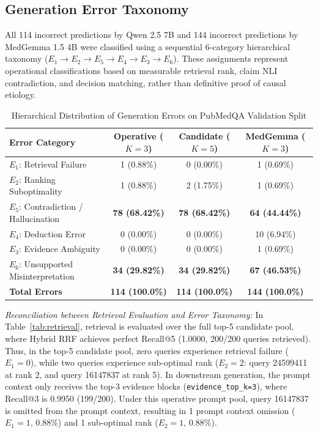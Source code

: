 \documentclass[journal,10pt]{IEEEtran}
\begin{document}
\subsection{Generation Error Taxonomy}
All 114 incorrect predictions by Qwen 2.5 7B and 144 incorrect predictions by MedGemma 1.5 4B were classified using a sequential 6-category hierarchical taxonomy ($E_1 \to E_2 \to E_5 \to E_4 \to E_3 \to E_6$). These assignments represent operational classifications based on measurable retrieval rank, claim NLI contradiction, and decision matching, rather than definitive proof of causal etiology.

\begin{table}[htbp]
\caption{Hierarchical Distribution of Generation Errors on PubMedQA Validation Split}
\label{tab:taxonomy}
\centering
\begin{tabular}{lccc}
\toprule
\textbf{Error Category} & \textbf{Operative ($K=3$)} & \textbf{Candidate ($K=5$)} & \textbf{MedGemma ($K=3$)} \\
\midrule
$E_1$: Retrieval Failure & 1 (0.88\%) & 0 (0.00\%) & 1 (0.69\%) \\
$E_2$: Ranking Suboptimality & 1 (0.88\%) & 2 (1.75\%) & 1 (0.69\%) \\
$E_5$: Contradiction / Hallucination & \textbf{78 (68.42\%)} & \textbf{78 (68.42\%)} & \textbf{64 (44.44\%)} \\
$E_4$: Deduction Error & 0 (0.00\%) & 0 (0.00\%) & 10 (6.94\%) \\
$E_3$: Evidence Ambiguity & 0 (0.00\%) & 0 (0.00\%) & 1 (0.69\%) \\
$E_6$: Unsupported Misinterpretation & \textbf{34 (29.82\%)} & \textbf{34 (29.82\%)} & \textbf{67 (46.53\%)} \\
\midrule
\textbf{Total Errors} & \textbf{114 (100.0\%)} & \textbf{114 (100.0\%)} & \textbf{144 (100.0\%)} \\
\bottomrule
\end{tabular}
\end{table}

\textit{Reconciliation between Retrieval Evaluation and Error Taxonomy:} In Table~\ref{tab:retrieval}, retrieval is evaluated over the full top-5 candidate pool, where Hybrid RRF achieves perfect Recall@5 (1.0000, 200/200 queries retrieved). Thus, in the top-5 candidate pool, zero queries experience retrieval failure ($E_1 = 0$), while two queries experience sub-optimal rank ($E_2 = 2$: query 24599411 at rank 2, and query 16147837 at rank 5). In downstream generation, the prompt context only receives the top-3 evidence blocks (\texttt{evidence\_top\_k=3}), where Recall@3 is 0.9950 (199/200). Under this operative prompt pool, query 16147837 is omitted from the prompt context, resulting in 1 prompt context omission ($E_1 = 1$, 0.88\%) and 1 sub-optimal rank ($E_2 = 1$, 0.88\%). 
\end{document}
